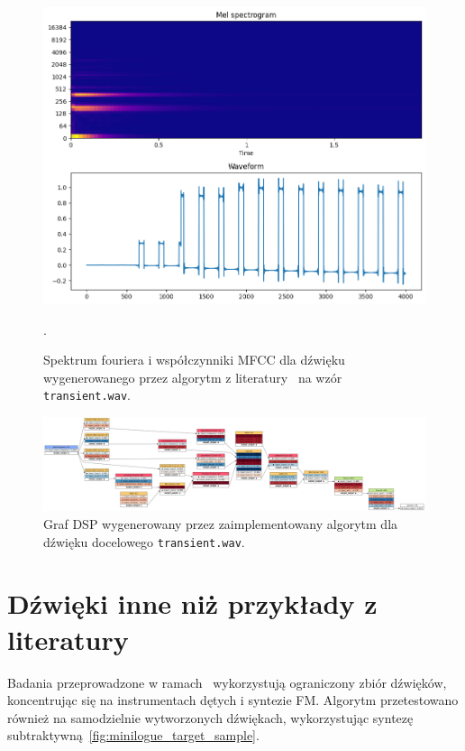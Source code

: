 \begin{multicols}{3}
\begin{figure}[H]
    \centering
    \includegraphics[width=0.9\linewidth]{rys06/macret_evolved_transient.png}
    \caption{
      Spektrum fouriera i współczynniki MFCC dla dźwięku wygenerowanego 
      przez algorytm z literatury~\cite{evolutionary_puredata} na wzór
      \texttt{transient.wav}.
    }\label{fig:evolved_literature_transient_sound_overview}.
\end{figure}
\end{multicols}

\begin{figure}[H]
    \centering
    \includegraphics[width=1.0\linewidth]{rys06/evolved_graph_transient.png}
    \caption{
      Graf DSP wygenerowany przez zaimplementowany algorytm
      dla dźwięku docelowego \texttt{transient.wav}.
    }\label{fig:evolved_graph_transient}
\end{figure}

\newpage
\section{Dźwięki inne niż przykłady z literatury}\label{sec:non_literature_samples}

Badania przeprowadzone w ramach~\cite{evolutionary_puredata}
wykorzystują ograniczony zbiór dźwięków, koncentrując
się na instrumentach dętych i syntezie FM\@. Algorytm przetestowano
również na samodzielnie wytworzonych dźwiękach, wykorzystując syntezę
subtraktywną~\ref{fig:minilogue_target_sample}.

